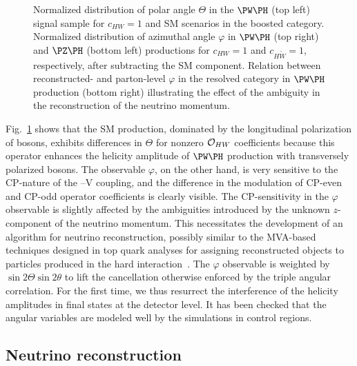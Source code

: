 \documentclass[a4paper,11pt]{article}
\renewcommand{\PV}{{{{V}}}\xspace}
\begin{document}
\begin{figure}[hbtp]
\begin{center}
\end{center}
\caption{
Normalized distribution of polar angle $\Theta$ in the $\PW\PH$ (top left) signal sample for $c_{HW}=1$ and SM scenarios in the boosted category. 
Normalized distribution of azimuthal angle $\varphi$ in  $\PW\PH$  (top right) and $\PZ\PH$ (bottom left) productions for $c_{HW}=1$ and $c_{H\widetilde{W}}=1$, respectively, after subtracting the SM component.%
Relation between reconstructed- and parton-level $\varphi$ in the resolved category in $\PW\PH$ production (bottom right) illustrating the effect of the ambiguity in the reconstruction of the neutrino momentum.
}
\label{fig:angles}
\end{figure}
Fig.~\ref{fig:angles} shows that
the SM production, dominated by the longitudinal polarization of \PW bosons, exhibits differences in $\Theta$ for nonzero ${\cal O}_{HW}$ coefficients because this operator enhances the helicity amplitude of $\PW\PH$ production with transversely polarized {\PW} bosons. 
The observable $\varphi$, on the other hand, is very sensitive to the CP-nature of the \PH--\PV coupling, and the difference in the modulation of CP-even and CP-odd operator coefficients is clearly visible.  
The CP-sensitivity in the $\varphi$ observable is slightly affected by the ambiguities introduced by the unknown $z$-component of the neutrino momentum. 
This necessitates the development of an algorithm for neutrino reconstruction, possibly similar to the MVA-based techniques designed in top quark analyses for assigning reconstructed objects to particles produced in the hard interaction~\cite{CMS:2019esx}.
The $\varphi$ observable is weighted by $\sin2\Theta\sin2\theta$ to lift the cancellation otherwise enforced by the triple angular correlation. 
For the first time, we thus resurrect the interference of the helicity amplitudes in \PH final states at the detector level. 
It has been checked that the angular variables are modeled well by the simulations in control regions.

\subsection{Neutrino reconstruction}
\label{sec:neu_reco}
\end{document}
